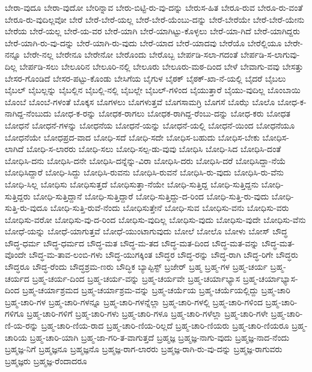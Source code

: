 {ಬೇರಾ-ವುದೂ
ಬೇರಾ-ವುದೋ
ಬೇರಿನ್ನಾವ
ಬೇರು-ಬಿಟ್ಟಿ-ರು-ವು-ದನ್ನು
ಬೇರುಸ-ಹಿತ
ಬೇರೂ-ರುವ
ಬೇರೂ-ರು-ವಂತೆ
ಬೇರೂ-ರು-ವುದಿಲ್ಲವೋ
ಬೇರೆ
ಬೇರೆ-ಬೇರೆ-ಯಲ್ಲ
ಬೇರೆ-ಬೇರೆ-ಯೆಂಬು-ದನ್ನು
ಬೇರೆ-ಬೇರೆಯೇ
ಬೇರೆ-ಬೇರೆ-ಯೇನು
ಬೇರೆಯ
ಬೇರೆ-ಯಲ್ಲ
ಬೇರೆ-ಯ-ವರ
ಬೇರೆ-ಯಾಗಿ
ಬೇರೆ-ಯಾಗಿಟ್ಟು-ಕೊಳ್ಳಲು
ಬೇರೆ-ಯಾ-ಗಿದೆ
ಬೇರೆ-ಯಾಗಿದ್ದರು
ಬೇರೆ-ಯಾಗಿ-ರು-ವು-ದನ್ನು
ಬೇರೆ-ಯಾಗಿ-ರು-ವುದು
ಬೇರೆ-ಯಾದ
ಬೇರೆ-ಯಾದವು
ಬೇರೆಯೊ
ಬೇರೆಲ್ಲಿಯೂ
ಬೇರೇ-ನನ್ನೂ
ಬೇರೇ-ನಲ್ಲ
ಬೇರೇನೂ
ಬೇರೇನೋ
ಬೇರೊಂದು
ಬೇರೊಬ್ಬ
ಬೇರ್ಪಡಿ-ಸಲಾ-ಗದಂತೆ
ಬೇರ್ಪಡಿ-ಸ-ಲಾಗುವು-ದಿಲ್ಲ
ಬೇರ್ಪಡಿ-ಸಲು
ಬೇಲೂರಿನ
ಬೇಲೂರಿ-ನಲ್ಲಿ
ಬೇಲೂರು
ಬೇಲೂರು-ಮಠ-ದಿಂದ
ಬೇಳೆ
ಬೇವಾಗು-ವವು
ಬೇಸತ್ತು
ಬೇಸರ-ಗೊಂಡಿದೆ
ಬೇಸರ-ಪಟ್ಟು-ಕೊಂಡು
ಬೇಸಿಗೆಯ
ಬೈಗುಳ
ಬೈಠಕ್
ಬೈಠಕ್-ಖಾ-ನೆ-ಯಲ್ಲಿ
ಬೈದರೆ
ಬೈಬಲು
ಬೈಬಲ್
ಬೈಬಲ್ಲನ್ನು
ಬೈಬಲ್ಲಿನ
ಬೈಬಲ್ಲಿ-ನಲ್ಲಿ
ಬೈಬಲ್ಲೇ
ಬೈಬಲ್-ಗಳಿಂದ
ಬೈಯುತ್ತಾರೆ
ಬೈಯು-ವುದಿಲ್ಲ
ಬೊಂಬಾಯಿ
ಬೊಂಬೆ
ಬೊಂಬೆ-ಗಳಂತೆ
ಬೊಕ್ಕಸ
ಬೊಗಳಲು
ಬೊಗಳುತ್ತವೆ
ಬೊಗಸಾಮಗ್ರಿ
ಬೊಗಸೆ
ಬೊಝೆ
ಬೊಲೊ
ಬೋಧ-ಕ-ನಾಗಿದ್ದ-ನೆಂಬುದು
ಬೋಧ-ಕ-ರನ್ನು
ಬೋಧಕ-ರಾಗಲು
ಬೋಧಕ-ರಾಗಿದ್ದ-ರೆಂಬು-ದನ್ನು
ಬೋಧ-ಕರು
ಬೋಧತ
ಬೋಧನೆ
ಬೋಧನೆ-ಗಳನ್ನು
ಬೋಧನೆಯ
ಬೋಧನೆ-ಯನ್ನು
ಬೋಧನೆ-ಯಲ್ಲಿ
ಬೋಧನೆ-ಯಿಂದ
ಬೋಧನೆಯೂ
ಬೋಧನೆಯೇ
ಬೋಧಪ್ರದ-ವಾದ
ಬೋಧಿ-ಸದೆ
ಬೋಧಿ-ಸದೇ
ಬೋಧಿಸ-ಬಹುದು
ಬೋಧಿಸ-ಬೇಕು
ಬೋಧಿಸ-ಲಾಗಿದೆ
ಬೋಧಿ-ಸ-ಲಾರರು
ಬೋಧಿ-ಸಲು
ಬೋಧಿ-ಸಲ್ಪ-ಡು-ವುವು
ಬೋಧಿಸಿ
ಬೋಧಿ-ಸಿದ
ಬೋಧಿಸಿ-ದಂತೆ
ಬೋಧಿಸಿ-ದನು
ಬೋಧಿಸಿ-ದನೇ
ಬೋಧಿಸಿ-ದನ್ನೆನ್ನು-ವಿರಾ
ಬೋಧಿಸಿ-ದರು
ಬೋಧಿಸಿ-ದರೆ
ಬೋಧಿಸಿದ್ದಾ-ನೆಯೆ
ಬೋಧಿಸಿದ್ದಾರೆ
ಬೋಧಿ-ಸಿದ್ದು
ಬೋಧಿಸಿ-ರುವನು
ಬೋಧಿಸಿ-ರುವನೆ
ಬೋಧಿಸಿ-ರು-ವುದು
ಬೋಧಿಸಿ-ರು-ವೆನು
ಬೋಧಿ-ಸಿಲ್ಲ
ಬೋಧಿಸು
ಬೋಧಿಸುತ್ತದೆ
ಬೋಧಿಸುತ್ತಾ-ನೆಯೇ
ಬೋಧಿ-ಸುತ್ತಿದ್ದ
ಬೋಧಿ-ಸುತ್ತಿದ್ದನು
ಬೋಧಿ-ಸುತ್ತಿದ್ದರು
ಬೋಧಿ-ಸುತ್ತಿದ್ದಾನೆ
ಬೋಧಿ-ಸುತ್ತಿದ್ದಾರೆ
ಬೋಧಿ-ಸುತ್ತಿದ್ದು-ದ-ರಿಂದ
ಬೋಧಿ-ಸುತ್ತಿ-ರು-ವುದು
ಬೋಧಿ-ಸುತ್ತಿ-ರು-ವುದೂ
ಬೋಧಿ-ಸುತ್ತಿ-ರುವೆ-ನೆಂದು
ಬೋಧಿಸುತ್ತೇನೆ
ಬೋಧಿ-ಸುವ
ಬೋಧಿಸು-ವನು
ಬೋಧಿಸು-ವರು
ಬೋಧಿಸು-ವರೋ
ಬೋಧಿಸು-ವು-ದ-ರಿಂದ
ಬೋಧಿಸು-ವುದಿಲ್ಲ
ಬೋಧಿಸು-ವುದು
ಬೋಧಿಸು-ವುದೇ
ಬೋಧಿಸು-ವೆನು
ಬೋಧೆ-ಯನ್ನು
ಬೋಧೆ-ಯಾಗುತ್ತವೆ
ಬೋಧೆ-ಯುಂಟಾಗುವುದು
ಬೋಲೆ
ಬೋಲೊ
ಬೋಳು
ಬೋಸ್
ಬೌದ್ಧ
ಬೌದ್ಧ-ಧರ್ಮ
ಬೌದ್ಧ-ಧರ್ಮದ
ಬೌದ್ಧ-ಮತ
ಬೌದ್ಧ-ಮ-ತದ
ಬೌದ್ಧ-ಮತ-ದಿಂದ
ಬೌದ್ಧ-ಮತ-ವನ್ನು
ಬೌದ್ಧ-ಮತ-ವೊಂದೇ
ಬೌದ್ಧ-ಮ-ತಾವ-ಲಂಬಿ-ಗಳು
ಬೌದ್ಧ-ಯುಗಕ್ಕಿಂತ
ಬೌದ್ಧರ
ಬೌದ್ಧ-ರನ್ನು
ಬೌದ್ಧ-ರಾಗಿ
ಬೌದ್ಧ-ರಿಗೇ
ಬೌದ್ಧರು
ಬೌದ್ಧರೂ
ಬೌದ್ಧ-ರೆಂದು
ಬೌದ್ಧಶ್ರಮ-ಣರು
ಬೌದ್ಧಿಕ
ಬ್ಯಾಪ್ಟಿಸ್ಟ್
ಬ್ರಜೇರ್
ಬ್ರಹ್ಮ
ಬ್ರಹ್ಮ-ಗಳ
ಬ್ರಹ್ಮ-ಚರ್ಯ
ಬ್ರಹ್ಮ-ಚರ್ಯದ
ಬ್ರಹ್ಮ-ಚರ್ಯ-ದಿಂದ
ಬ್ರಹ್ಮ-ಚರ್ಯ-ವನ್ನು
ಬ್ರಹ್ಮ-ಚರ್ಯವೇ
ಬ್ರಹ್ಮ-ಚರ್ಯಾಭ್ಯಾಸ
ಬ್ರಹ್ಮ-ಚರ್ಯಾಭ್ಯಾಸ-ದಿಂದ
ಬ್ರಹ್ಮ-ಚರ್ಯಾಶ್ರಮದ
ಬ್ರಹ್ಮ-ಚರ್ಯಾಶ್ರಮ-ವನ್ನು
ಬ್ರಹ್ಮ-ಚರ್ಯೆಯ
ಬ್ರಹ್ಮ-ಚರ್ಯೆಯಲ್ಲಿದ್ದು
ಬ್ರಹ್ಮ-ಚಾರಿ
ಬ್ರಹ್ಮ-ಚಾರಿ-ಗಳ
ಬ್ರಹ್ಮ-ಚಾರಿ-ಗಳನ್ನೂ
ಬ್ರಹ್ಮ-ಚಾರಿ-ಗಳನ್ನೆಲ್ಲಾ
ಬ್ರಹ್ಮ-ಚಾರಿ-ಗಳಲ್ಲಿ
ಬ್ರಹ್ಮ-ಚಾರಿ-ಗಳಿಂದ
ಬ್ರಹ್ಮ-ಚಾರಿ-ಗಳಿಗೂ
ಬ್ರಹ್ಮ-ಚಾರಿ-ಗಳಿಗೆ
ಬ್ರಹ್ಮ-ಚಾರಿ-ಗಳು
ಬ್ರಹ್ಮ-ಚಾರಿ-ಗಳೂ
ಬ್ರಹ್ಮ-ಚಾರಿ-ಗಳೆಲ್ಲಾ
ಬ್ರಹ್ಮ-ಚಾರಿ-ಗಳೇ
ಬ್ರಹ್ಮ-ಚಾರಿ-ಣಿ-ಯ-ರನ್ನು
ಬ್ರಹ್ಮ-ಚಾರಿ-ಣಿಯ-ರಾದ
ಬ್ರಹ್ಮ-ಚಾರಿ-ಣಿಯ-ರಿಲ್ಲದೆ
ಬ್ರಹ್ಮ-ಚಾರಿ-ಣಿಯರು
ಬ್ರಹ್ಮ-ಚಾರಿ-ಣಿಯರೂ
ಬ್ರಹ್ಮ-ಚಾರಿಯ
ಬ್ರಹ್ಮ-ಚಾರಿ-ಯಾಗಿ
ಬ್ರಹ್ಮ-ಜಾ-ಗರಿ-ತ-ವಾಗುತ್ತದೆ
ಬ್ರಹ್ಮಜ್ಞ
ಬ್ರಹ್ಮಜ್ಞ-ನಾಗು-ವುದು
ಬ್ರಹ್ಮಜ್ಞ-ನಾದ-ನೆಂದು
ಬ್ರಹ್ಮಜ್ಞ-ನಿಗೆ
ಬ್ರಹ್ಮಜ್ಞನೂ
ಬ್ರಹ್ಮಜ್ಞನೊ
ಬ್ರಹ್ಮಜ್ಞ-ರಾಗ-ಲಾರರು
ಬ್ರಹ್ಮಜ್ಞ-ರಾಗಿ-ರು-ವು-ದನ್ನು
ಬ್ರಹ್ಮಜ್ಞ-ರಾಗುವರು
ಬ್ರಹ್ಮಜ್ಞರು
ಬ್ರಹ್ಮಜ್ಞ-ರೆಂದಾದರೂ
}
